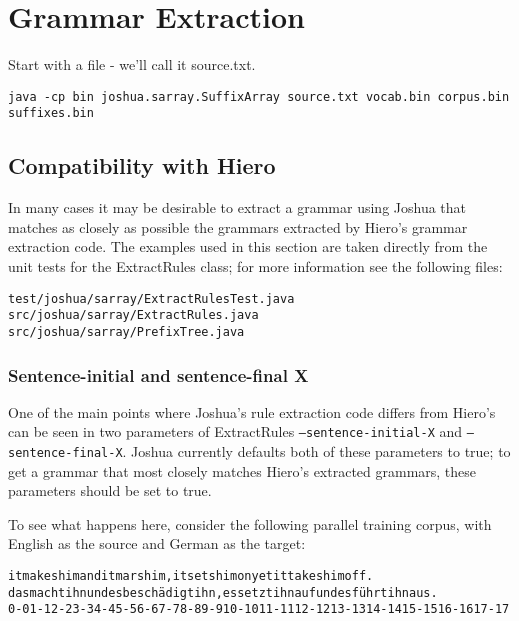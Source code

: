 \chapter{Grammar Extraction}

Start with a file - we'll call it source.txt. 

\begin{verbatim}
java -cp bin joshua.sarray.SuffixArray source.txt vocab.bin corpus.bin suffixes.bin
\end{verbatim}


\section{Compatibility with Hiero}

In many cases it may be desirable to extract a grammar using Joshua that matches as closely as possible the grammars extracted by Hiero's grammar extraction code. The examples used in this section are taken directly from the unit tests for the ExtractRules class; for more information see the following files:

\begin{verbatim}
test/joshua/sarray/ExtractRulesTest.java
src/joshua/sarray/ExtractRules.java
src/joshua/sarray/PrefixTree.java
\end{verbatim}


\subsection{Sentence-initial and sentence-final X}

One of the main points where Joshua's rule extraction code differs from Hiero's can be seen in two parameters of ExtractRules {\tt --sentence-initial-X} and {\tt --sentence-final-X}. Joshua currently defaults both of these parameters to true; to get a grammar that most closely matches Hiero's extracted grammars, these parameters should be set to true.

To see what happens here, consider the following parallel training corpus, with English as the source and German as the target:

\begin{alltt}
it makes him and it mars him , it sets him on yet it takes him off .
das macht ihn und es besch\"adigt ihn , es setzt ihn auf und es f\"uhrt ihn aus .
0-0 1-1 2-2 3-3 4-4 5-5 6-6 7-7 8-8 9-9 10-10 11-11 12-12 13-13 14-14 15-15 16-16 17-17
\end{alltt}

